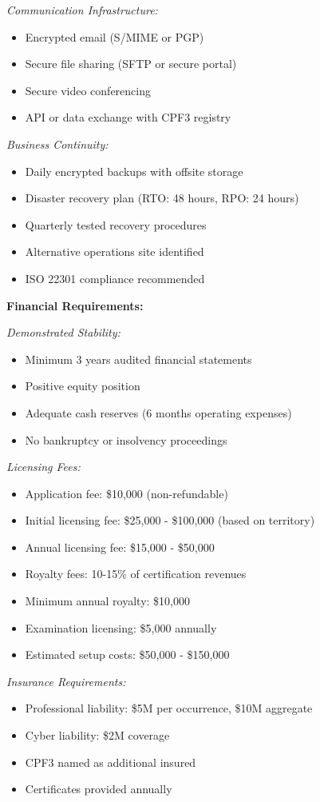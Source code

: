 \documentclass[11pt,a4paper]{article}
\begin{document}
\textit{Communication Infrastructure:}
\begin{itemize}
\item Encrypted email (S/MIME or PGP)
\item Secure file sharing (SFTP or secure portal)
\item Secure video conferencing
\item API or data exchange with CPF3 registry
\end{itemize}

\textit{Business Continuity:}
\begin{itemize}
\item Daily encrypted backups with offsite storage
\item Disaster recovery plan (RTO: 48 hours, RPO: 24 hours)
\item Quarterly tested recovery procedures
\item Alternative operations site identified
\item ISO 22301 compliance recommended
\end{itemize}

\textbf{Financial Requirements:}

\textit{Demonstrated Stability:}
\begin{itemize}
\item Minimum 3 years audited financial statements
\item Positive equity position
\item Adequate cash reserves (6 months operating expenses)
\item No bankruptcy or insolvency proceedings
\end{itemize}

\textit{Licensing Fees:}
\begin{itemize}
\item Application fee: \$10,000 (non-refundable)
\item Initial licensing fee: \$25,000 - \$100,000 (based on territory)
\item Annual licensing fee: \$15,000 - \$50,000
\item Royalty fees: 10-15\% of certification revenues
\item Minimum annual royalty: \$10,000
\item Examination licensing: \$5,000 annually
\item Estimated setup costs: \$50,000 - \$150,000
\end{itemize}

\textit{Insurance Requirements:}
\begin{itemize}
\item Professional liability: \$5M per occurrence, \$10M aggregate
\item Cyber liability: \$2M coverage
\item CPF3 named as additional insured
\item Certificates provided annually
\end{itemize}
\end{document}
